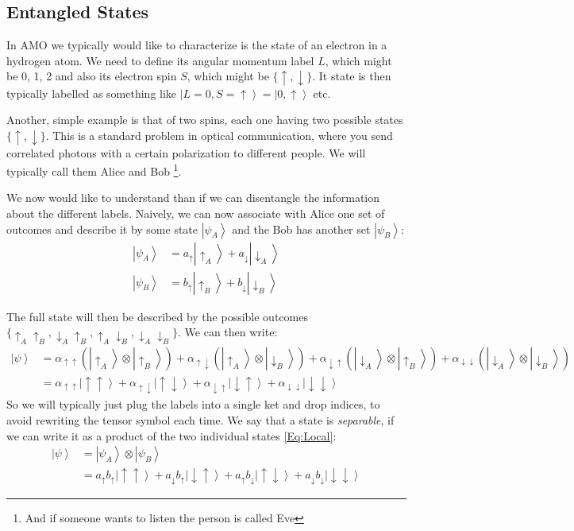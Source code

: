 \documentclass[10pt]{article}
\newcommand{\ket}[1]{\ensuremath{\left|#1\right\rangle}}
\begin{document}
\subsection{Entangled States}
 
In AMO we typically would like to characterize is the state of an electron in a hydrogen atom. We need to define its angular momentum label $L$, which might be 0, 1, 2 and also its electron spin $S$, which might be $\{\uparrow, \downarrow\}$. It state is then typically labelled as something like $\ket{L=0, S=\uparrow} = \ket{0,\uparrow}$ etc.

Another, simple example is that of two spins, each one having two possible states $\{\uparrow, \downarrow\}$. This is a standard problem in optical communication, where you send correlated photons with a certain polarization to different people. We will typically call them Alice and Bob \footnote{And if someone wants to listen the person is called Eve}.

We now  would like to understand than if we can disentangle the information about the different labels. Naively, we can now  associate with Alice one set of outcomes and describe it by some state $\ket{\psi_{A}}$ and the Bob has another set $\ket{\psi_{B}}$:
\begin{align}\label{Eq:Local}
\ket{\psi_A}&= a_{\uparrow} \ket{\uparrow_A}+ a_{\downarrow} \ket{\downarrow_A}\\
\ket{\psi_B}&= b_{\uparrow} \ket{\uparrow_B}+ b_{\downarrow} \ket{\downarrow_B}
\end{align}

The full state will then be described by the possible outcomes $\{\uparrow_A\uparrow_B,\downarrow_A\uparrow_B,\uparrow_A\downarrow_B, \downarrow_A\downarrow_B\}$. We can then write:
\begin{align}
\ket{\psi} &= \alpha_{\uparrow\uparrow}(\ket{\uparrow_A}\otimes\ket{\uparrow_B})+\alpha_{\uparrow\downarrow}(\ket{\uparrow_A}\otimes\ket{\downarrow_B})+\alpha_{\downarrow\uparrow}(\ket{\downarrow_A}\otimes\ket{\uparrow_B})+\alpha_{\downarrow\downarrow}(\ket{\downarrow_A}\otimes\ket{\downarrow_B})\\
&= \alpha_{\uparrow\uparrow}\ket{\uparrow\uparrow}+\alpha_{\uparrow\downarrow}\ket{\uparrow\downarrow}+\alpha_{\downarrow\uparrow}\ket{\downarrow \uparrow}+\alpha_{\downarrow\downarrow}\ket{\downarrow\downarrow}
\end{align}
So we will typically just plug the labels into a single ket and drop indices, to avoid rewriting the tensor symbol each time. We say that a state is \textit{separable}, if we can write it as a product of the two individual states \eqref{Eq:Local}:
\begin{align}
\ket{\psi} &= \ket{\psi_A}\otimes\ket{\psi_B}\\
&=a_{\uparrow} b_\uparrow \ket{\uparrow\uparrow}+a_{\downarrow} b_\uparrow \ket{\downarrow\uparrow}+a_{\uparrow} b_\downarrow \ket{\uparrow\downarrow}+a_{\downarrow} b_\downarrow \ket{\downarrow\downarrow}
\end{align}
\end{document}
